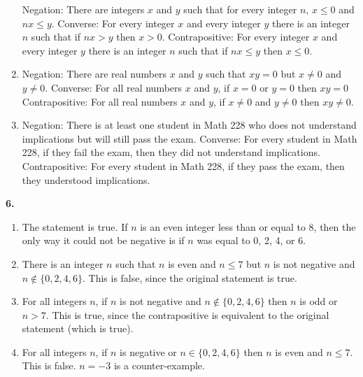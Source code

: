 \documentclass[10pt,]{book}
\theoremstyle{plain}
\theoremstyle{definition}
\theoremstyle{definition}
\theoremstyle{definition}
\numberwithin{equation}{chapter}
\begin{document}
\begin{enumerate}[label=(\alph*)]
                Negation: There are integers \(x\) and \(y\) such that for every integer \(n\), \(x \le 0\) and \(nx \le y\).
                Converse: For every integer \(x\) and every integer \(y\) there is an integer \(n\) such that if \(nx > y\) then \(x > 0\).
                Contrapositive: For every integer \(x\) and every integer \(y\) there is an integer \(n\) such that if \(nx \le y\) then \(x \le 0\).
\item\hypertarget{li-1135}{}
                Negation: There are real numbers \(x\) and \(y\) such that \(xy = 0\) but \(x \ne 0\) and \(y \ne 0\).
                Converse: For all real numbers \(x\) and \(y\), if \(x = 0\) or \(y = 0\) then \(xy = 0\)
                Contrapositive: For all real numbers \(x\) and \(y\), if \(x \ne 0\) and \(y \ne 0\) then \(xy \ne 0\).
\item\hypertarget{li-1136}{}
                Negation: There is at least one student in Math 228 who does not understand implications but will still pass the exam.
                Converse: For every student in Math 228, if they fail the exam, then they did not understand implications.
                Contrapositive: For every student in Math 228, if they pass the exam, then they understood implications.
\end{enumerate}
\par\smallskip
\noindent\textbf{6.}\quad{}\leavevmode%
\begin{enumerate}[label=(\alph*)]
\item\hypertarget{li-1141}{}
                The statement is true. If \(n\) is an even integer less than or equal to 8, then the only way it could not be negative is if \(n\) was equal to 0, 2, 4, or 6.
\item\hypertarget{li-1142}{}
                There is an integer \(n\) such that \(n\) is even and \(n \le 7\) but \(n\) is not negative and \(n \not\in \{0,2,4,6\}\). This is false, since the original statement is true.
\item\hypertarget{li-1143}{}
                For all integers \(n\), if \(n\) is not negative and \(n \not\in\{0,2,4,6\}\) then \(n\) is odd or \(n > 7\). This is true, since the contrapositive is equivalent to the original statement (which is true).
\item\hypertarget{li-1144}{}
                For all integers \(n\), if \(n\) is negative or \(n \in \{0,2,4,6\}\) then \(n\) is even and \(n \le 7\). This is false. \(n = -3\) is a counter-example.
\end{enumerate}
\end{document}
